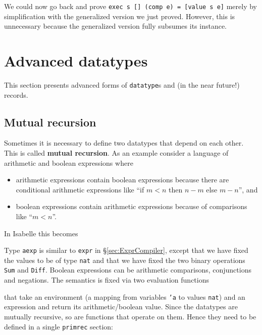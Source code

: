 We could now go back and prove \texttt{exec s [] (comp e) = [value s e]}
merely by simplification with the generalized version we just proved.
However, this is unnecessary because the generalized version fully subsumes
its instance.


\section{Advanced datatypes}

This section presents advanced forms of \texttt{datatype}s and (in the near
future!) records.

\subsection{Mutual recursion}
\label{sec:datatype-mut-rec}

Sometimes it is necessary to define two datatypes that depend on each
other. This is called \textbf{mutual recursion}. As an example consider a
language of arithmetic and boolean expressions where
\begin{itemize}
\item arithmetic expressions contain boolean expressions because there are
  conditional arithmetic expressions like ``if $m<n$ then $n-m$ else $m-n$'',
  and
\item boolean expressions contain arithmetic expressions because of
  comparisons like ``$m<n$''.
\end{itemize}
In Isabelle this becomes
\begin{ttbox}
\end{ttbox}
Type \texttt{aexp} is similar to \texttt{expr} in \S\ref{sec:ExprCompiler},
except that we have fixed the values to be of type \texttt{nat} and that we
have fixed the two binary operations \texttt{Sum} and \texttt{Diff}. Boolean
expressions can be arithmetic comparisons, conjunctions and negations.
The semantics is fixed via two evaluation functions
\begin{ttbox}
\end{ttbox}
that take an environment (a mapping from variables \texttt{'a} to values
\texttt{nat}) and an expression and return its arithmetic/boolean
value. Since the datatypes are mutually recursive, so are functions that
operate on them. Hence they need to be defined in a single \texttt{primrec}
section:
\begin{ttbox}

\end{ttbox}

